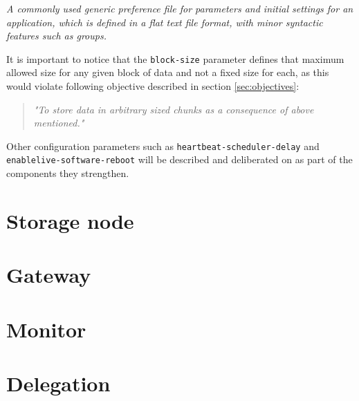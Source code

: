 \vspace*{4mm}
\begin{definition}[.cfg] \label{def:cfg}
\textit{A commonly used generic preference file for parameters and initial settings for an application, which is defined in a flat text file format, with minor syntactic features such as groups.}
\end{definition}
\vspace*{6mm}

It is important to notice that the \texttt{block-size} parameter defines that maximum allowed size for any given block of data and not a fixed size for each, as this would violate following objective described in section \ref{sec:objectives}:

\begin{quotation}
	\textit{"To store data in arbitrary sized chunks as a consequence of above mentioned."}
\end{quotation}

Other configuration parameters such as \texttt{heartbeat-scheduler-delay} and \texttt{enable\-live-software-reboot} will be described and deliberated on as part of the components they strengthen.

\section{Storage node} \label{sec:storage}

\section{Gateway} \label{sec:gateway}

\section{Monitor} \label{sec:monitor}

\section{Delegation} \label{sec:delegation}

